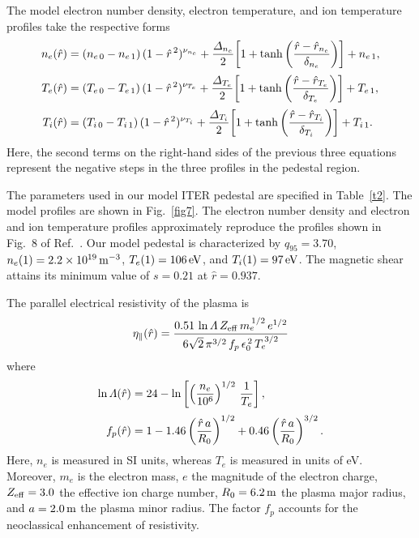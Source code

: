 \documentclass[12pt,prb,aps]{revtex4-1}
\begin{document}
The model electron number density, electron temperature, and ion temperature profiles take the respective forms
\begin{align}
n_e(\hat{r}) &=(n_{e\,0}-n_{e\,1})\,(1-\hat{r}^{\,2})^{\nu_{n_e}} + \frac{{\mit\Delta}_{n_e}}{2}\!
\left[1+\tanh\left(\frac{\hat{r}-\hat{r}_{n_e}}{\delta_{n_e}}\right)\right] + n_{e\,1},\\[0.5ex]
T_e(\hat{r}) &=(T_{e\,0}-T_{e\,1})\,(1-\hat{r}^{\,2})^{\nu_{T_e}} + \frac{{\mit\Delta}_{T_e}}{2}\!
\left[1+\tanh\left(\frac{\hat{r}-\hat{r}_{T_e}}{\delta_{T_e}}\right)\right] + T_{e\,1},\\[0.5ex]
T_i(\hat{r}) &=(T_{i\,0}-T_{i\,1})\,(1-\hat{r}^{\,2})^{\nu_{T_i}} + \frac{{\mit\Delta}_{T_i}}{2}\!
\left[1+\tanh\left(\frac{\hat{r}-\hat{r}_{T_i}}{\delta_{T_i}}\right)\right] + T_{i\,1}.
\end{align}
Here, the second terms on the right-hand sides of the previous three equations  represent the negative steps in the
three profiles in the pedestal region. 

The parameters used in our model ITER pedestal are specified in Table~\ref{t2}. The model profiles are shown in Fig.~\ref{fig7}. The electron number density and electron and ion temperature profiles  approximately reproduce the profiles shown in Fig.~8 of Ref.~. Our model pedestal is characterized by $q_{95} =3.70$, $n_e(1)=2.2\times 10^{19}\,{\rm m}^{-3}$, $T_e(1)= 106\,{\rm eV}$, and
$T_i(1)= 97\,{\rm eV}$. The magnetic shear attains its minimum value of $s=0.21$ at $\hat{r}= 0.937$. 

The parallel electrical resistivity of the plasma is\,\cite{ric3}
\begin{equation}
\eta_\parallel(\hat{r}) = \frac{0.51\,\ln{\mit\Lambda}\,Z_{\rm eff}\,m_e^{\,1/2}\,e^{1/2}}{6\sqrt{2}\,\pi^{3/2}\,f_p\,\epsilon_0^{\,2}\,T_e^{\,3/2}}
\end{equation}
where
\begin{align}
\ln{\mit\Lambda}(\hat{r}) &= 24 - \ln\left[\left(\frac{n_e}{10^6}\right)^{1/2}\,\frac{1}{T_e}\right],\\[0.5ex]
f_p(\hat{r}) &= 1 - 1.46\left(\frac{\hat{r}\,a}{R_0}\right)^{1/2} + 0.46\left(\frac{\hat{r}\,a}{R_0}\right)^{3/2}.\label{fp}
\end{align}
Here, $n_e$ is measured in SI units, whereas $T_e$ is measured in units of eV. Moreover, $m_e$ is the electron mass, $e$ the magnitude of the electron charge,
$Z_{\rm eff}=3.0$ the effective ion charge number, $R_0=6.2\,{\rm m}$ the plasma major radius, and $a=2.0\,{\rm m}$ the plasma minor radius.\cite{hartwig} 
The factor $f_p$ accounts for the neoclassical enhancement of resistivity.\cite{hinton}
\end{document}
